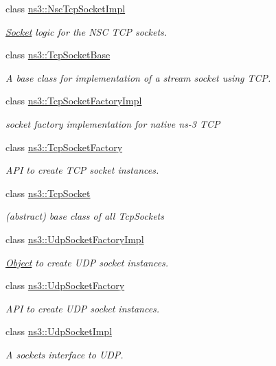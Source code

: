 \begin{DoxyCompactItemize}
class \hyperlink{classns3_1_1NscTcpSocketImpl}{ns3\+::\+Nsc\+Tcp\+Socket\+Impl}
\begin{DoxyCompactList}\small\item\em \hyperlink{classns3_1_1Socket}{Socket} logic for the N\+SC T\+CP sockets. \end{DoxyCompactList}\item 
class \hyperlink{classns3_1_1TcpSocketBase}{ns3\+::\+Tcp\+Socket\+Base}
\begin{DoxyCompactList}\small\item\em A base class for implementation of a stream socket using T\+CP. \end{DoxyCompactList}\item 
class \hyperlink{classns3_1_1TcpSocketFactoryImpl}{ns3\+::\+Tcp\+Socket\+Factory\+Impl}
\begin{DoxyCompactList}\small\item\em socket factory implementation for native ns-\/3 T\+CP \end{DoxyCompactList}\item 
class \hyperlink{classns3_1_1TcpSocketFactory}{ns3\+::\+Tcp\+Socket\+Factory}
\begin{DoxyCompactList}\small\item\em A\+PI to create T\+CP socket instances. \end{DoxyCompactList}\item 
class \hyperlink{classns3_1_1TcpSocket}{ns3\+::\+Tcp\+Socket}
\begin{DoxyCompactList}\small\item\em (abstract) base class of all Tcp\+Sockets \end{DoxyCompactList}\item 
class \hyperlink{classns3_1_1UdpSocketFactoryImpl}{ns3\+::\+Udp\+Socket\+Factory\+Impl}
\begin{DoxyCompactList}\small\item\em \hyperlink{classns3_1_1Object}{Object} to create U\+DP socket instances. \end{DoxyCompactList}\item 
class \hyperlink{classns3_1_1UdpSocketFactory}{ns3\+::\+Udp\+Socket\+Factory}
\begin{DoxyCompactList}\small\item\em A\+PI to create U\+DP socket instances. \end{DoxyCompactList}\item 
class \hyperlink{classns3_1_1UdpSocketImpl}{ns3\+::\+Udp\+Socket\+Impl}
\begin{DoxyCompactList}\small\item\em A sockets interface to U\+DP. \end{DoxyCompactList}\item 

\end{DoxyCompactItemize}

